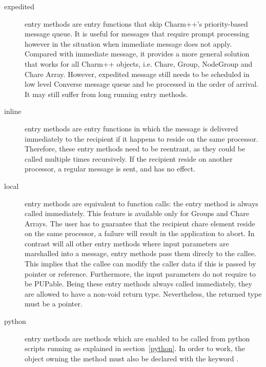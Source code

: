 \begin{description}
\item[expedited] entry methods are entry functions 
that skip Charm++'s priority-based message queue. It is useful for messages that
require prompt processing however in the situation when immediate message does
not apply. Compared with immediate message, it provides a more general solution
that works for all Charm++ objects, i.e. Chare, Group, NodeGroup and Chare
Array. However, expedited message still needs to be scheduled in low level
Converse message queue and be processed in the order of arrival. It may still
suffer from long running entry methods.

\item[inline] entry methods are entry functions in which the
message is delivered immediately to the recipient if it happens to reside on the
same processor. Therefore, these entry methods need to be reentrant, as they
could be called multiple times recursively. If the recipient reside on another
processor, a regular message is sent, and  has no effect.

\item[local] entry methods are equivalent to function calls: the
entry method is always called immediately. This feature is available only for
Groups and Chare Arrays. The user has to guarantee that the recipient chare
element reside on the same processor, a failure will result in the application
to abort. In contrast will all other entry methods where input parameters are
marshalled into a message,  entry methods pass them direcly to the
callee. This implies that the callee can modify the caller data if this is
passed by pointer or reference. Furthermore, the input parameters do not require
to be PUPable. Being these entry methods always called immediately, they are
allowed to have a non-void return type. Nevertheless, the returned type must be
a pointer.

\item[python] entry methods are methods which are enabled to be
called from python scripts running as explained in section~\ref{python}. In
order to work, the object owning the method must also be declared with the
keyword .

\end{description}
